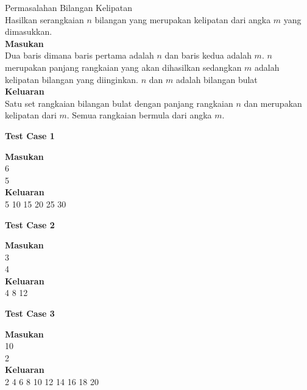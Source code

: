\begin{permasalahan}{Permasalahan Bilangan Kelipatan}\\
\label{prob:bilanganKelipatan}
	Hasilkan serangkaian $n$ bilangan yang merupakan kelipatan dari angka $m$ yang dimasukkan.\\
	\textbf{Masukan}\\
	Dua baris dimana baris pertama adalah $n$ dan baris kedua adalah $m$. $n$ merupakan panjang rangkaian yang akan dihasilkan sedangkan $m$ adalah kelipatan bilangan yang diinginkan. $n$ dan $m$ adalah bilangan bulat\\
	\textbf{Keluaran}\\
	Satu set rangkaian bilangan bulat dengan panjang rangkaian $n$ dan merupakan kelipatan dari $m$. Semua rangkaian bermula dari angka $m$.\\
	\begin{center}
	\textbf{Test Case 1}\\
	\end{center}
	\textbf{Masukan}\\
	6\\
	5\\
	\textbf{Keluaran}\\
	5 10 15 20 25 30 \\
	\begin{center}
	\textbf{Test Case 2}\\
	\end{center}
	\textbf{Masukan}\\
	3\\
	4\\
	\textbf{Keluaran}\\
	4 8 12 \\
	\begin{center}
	\textbf{Test Case 3}\\
	\end{center}
	\textbf{Masukan}\\
	10\\
	2\\
	\textbf{Keluaran}\\
	2 4 6 8 10 12 14 16 18 20\\

\end{permasalahan}

